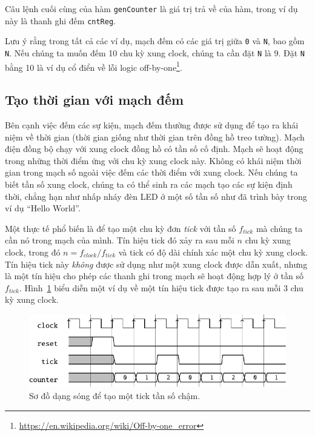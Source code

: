 \documentclass[%
    10pt,
    headinclude, footexclude,
    openright, %
    notitlepage,
    cleardoubleempty,
    headsepline,
    pointlessnumbers,
    bibtotoc, idxtotoc,
    ]{scrbook}
\newcommand{\code}[1]{{\small{\texttt{#1}}}}
\newcommand{\myref}[2]{\href{#1}{#2}}
\renewcommand{\myref}[2]{{#2}{\footnote{\url{#1}}}}
\begin{document}

\noindent Câu lệnh cuối cùng của hàm \code{genCounter} là giá trị trả về 
của hàm, trong ví dụ này là thanh ghi đếm \code{cntReg}.

Lưu ý rằng trong tất cả các ví dụ, mạch đếm có các giá trị giữa \code{0} và
\code{N}, bao gồm \code{N}. Nếu chúng ta muốn đếm 10 chu kỳ xung clock, chúng ta cần
đặt \code{N} là 9. Đặt \code{N} bằng 10 là ví dụ cổ điển về
\myref{https://en.wikipedia.org/wiki/Off-by-one_error}{lỗi logic off-by-one}.

\subsection{Tạo thời gian với mạch đếm}
\label{sec:gen:timing}


Bên cạnh việc đếm các sự kiện, mạch đếm thường được sử dụng để tạo ra khái niệm về thời gian (thời gian giống như thời gian trên đồng hồ treo tường).
Mạch điện đồng bộ chạy với xung clock đồng hồ có tần số cố định.
Mạch sẽ hoạt động trong những thời điểm ứng với chu kỳ xung clock này. Không có khái niệm thời gian trong mạch số ngoài việc đếm các thời điểm với xung clock. Nếu chúng ta biết tần số xung clock, chúng ta có thể sinh ra các mạch tạo các sự kiện định thời, chẳng hạn như nhấp nháy đèn LED ở một số tần số như đã trình bày trong ví dụ ``Hello World''. 

Một thực tế phổ biến là để tạo một chu kỳ đơn \emph{tick} với tần số $f_{tick}$ mà chúng ta cần nó trong mạch của mình. Tín hiệu tick đó xảy ra sau mỗi $n$ chu kỳ xung clock, trong đó $n = f_{clock}/f_{tick}$ và tick có độ dài chính xác một chu kỳ xung clock.
Tín hiệu tick này \emph{không} được sử dụng như một xung clock được dẫn xuất, nhưng là một tín hiệu cho phép các thanh ghi trong mạch sẽ hoạt động hợp lý ở tần số $f_{tick}$.
Hình~\ref{fig:tick-wave} biểu diễn một ví dụ về một tín hiệu tick được tạo ra sau mỗi 3 chu kỳ xung clock. 

\begin{figure}
  \centering
  \includegraphics[scale=1]{figures/tick_wave}
  \caption{Sơ đồ dạng sóng để tạo một tick tần số chậm.}
  \label{fig:tick-wave}
\end{figure}
\end{document}
